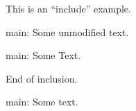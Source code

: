 \documentclass{article}
\begin{document}
	This is an ``include'' example.

	\listofchanges

	main: Some unmodified text.

	main: Some  Text.
	
	
	
	
	
	End of inclusion.
	
	main: Some  text.
\end{document}
